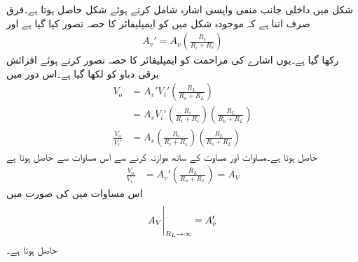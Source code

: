 شکل  میں  داخلی جانب منفی واپسی  اشارہ  شامل کرتے ہوئے  شکل  حاصل ہوتا ہے۔فرق صرف اتنا ہے کہ موجودہ شکل میں  کو ایمپلیفائر کا حصہ تصور کیا گیا ہے اور 
\begin{align} \label{مساوات_واپسی_افزائش_برقی_دباو_بمع_اشارہ_مزاحمت}
A_v'=A_v \left (\frac{R_i}{R_i + R_s} \right )
\end{align} 
رکھا گیا ہے۔یوں اشارے کی مزاحمت  کو ایمپلیفائر کا حصہ تصور کرتے ہوئے افزائش برقی دباو کو  لکھا گیا ہے۔اس دور میں
\begin{align*}
V_o &=A_v'  V_i' \left (\frac{R_L}{R_o +R_L} \right) \\
&= A_v V_i' \left (\frac{R_i}{R_i+R_s} \right ) \left (\frac{R_L}{R_o+R_L} \right ) \\
\frac{V_o}{V_i'}&=A_v \left (\frac{R_i}{R_i+R_s} \right ) \left (\frac{R_L}{R_o+R_L} \right  )
\end{align*}
حاصل ہوتا ہے۔مساوات  اور مساوت  کے ساتھ موازنہ کرنے سے اس مساوات سے حاصل ہوتا ہے
\begin{align}  \label{مساوات_واپسی_دباو_افزائش_ب}
\frac{V_o}{V_i'}&=A_v' \left (\frac{R_L}{R_o+R_L} \right  ) =A_V
\end{align}
اس مساوات میں  کی صورت میں
\begin{align} \label{مساوات_واپسی_لامحدود_مزاحمت_پر_افزائش_برقی_دباو_ب}
\eval{A_V}_{R_L \to \infty} = A_v'
\end{align}
حاصل ہوتا ہے۔

